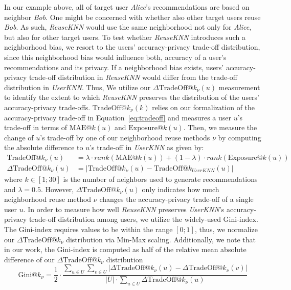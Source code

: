 \documentclass[manuscript,review,anonymous]{acmart}
\begin{document}
In our example above, all of target user \emph{Alice}'s recommendations are based on neighbor \emph{Bob}.
One might be concerned with whether also other target users reuse \emph{Bob}. 
As such, \emph{ReuseKNN} would use the same neighborhood not only for \emph{Alice}, but also for other target users.
To test whether \emph{ReuseKNN} introduces such a neighborhood bias, we resort to the users' accuracy-privacy trade-off distribution, since this neighborhood bias would influence both, accuracy of a user's recommendations and its privacy.
If a neighborhood bias exists, users' accuracy-privacy trade-off distribution in \emph{ReuseKNN} would differ from the trade-off distribution in \emph{UserKNN}.
Thus, We utilize our $\Delta\text{TradeOff}@k_\nu(u)$ measurement to identify the extent to which \emph{ReuseKNN} preserves the distribution of the users' accuracy-privacy trade-offs.
$\text{TradeOff}@k_\nu(k)$ relies on our formalization of the accuracy-privacy trade-off in Equation~\ref{eq:tradeoff} and measures a user $u$'s trade-off in terms of $\mathrm{MAE}@k(u)$ and $\mathrm{Exposure}@k(u)$.
Then, we measure the change of $u$'s trade-off by one of our neighborhood reuse methods $\nu$ by computing the absolute difference to $u$'s trade-off in \emph{UserKNN} as given by: 
\begin{align}
    \text{TradeOff}@k_\nu(u) &= \lambda \cdot rank(\mathrm{MAE}@k(u)) + (1 - \lambda) \cdot rank(\mathrm{Exposure}@k(u)) \\
    \Delta \text{TradeOff}@k_\nu(u) &= |\text{TradeOff}@k_\nu(u) - \text{TradeOff}@k_{UserKNN}(u)|
\end{align}
where $k \in [1; 30]$ is the number of neighbors used to generate recommendations and $\lambda=0.5 $.
However, $\Delta \text{TradeOff}@k_\nu(u)$ only indicates how much neighborhood reuse method $\nu$ changes the accuracy-privacy trade-off of a single user $u$.
In order to measure how well \emph{ReuseKNN} preserves \emph{UserKNN}'s accuracy-privacy trade-off distribution among users, we utilize the widely-used Gini-index.
The Gini-index requires values to be within the range $[0; 1]$, thus, we normalize our $\Delta \text{TradeOff}@k_\nu$ distribution via Min-Max scaling.
Additionally, we note that in our work, the Gini-index is computed as half of the relative mean absolute difference of our $\Delta \text{TradeOff}@k_\nu$ distribution~\cite{sen1997economic}
\begin{equation}
    \mathrm{Gini}@k_\nu = \frac{1}{2}\cdot\frac{\sum_{u \in U} \sum_{v \in U} | \Delta \text{TradeOff}@k_\nu(u) - \Delta \text{TradeOff}@k_\nu(v) |}{|U| \cdot \sum_{u \in U} \Delta \text{TradeOff}@k_\nu(u)}
\end{equation}
\end{document}
